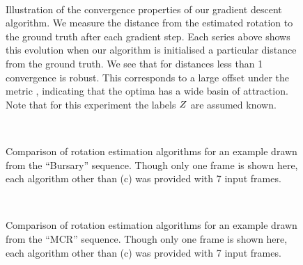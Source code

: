 \begin{figure}[tb]
  \centering
  \\
  \caption{Illustration of the convergence properties of our gradient
    descent algorithm. We measure the distance from the estimated
    rotation to the ground truth after each gradient step. Each series
    above shows this evolution when our algorithm is initialised a
    particular distance from the ground truth. We see that for
    distances less than 1 convergence is robust. This corresponds to a
    large offset under the metric , indicating
    that the optima has a wide basin of attraction. Note that for this
    experiment the labels $\Indicators$ are assumed known.}
  \label{fig:rotation-convergence}
\end{figure}

\begin{figure}[p]
  \centering
  \quad
  \\
  \quad
  \caption{Comparison of rotation estimation algorithms for an example
    drawn from the ``Bursary'' sequence. Though only one frame is
    shown here, each algorithm other than (c) was provided with 7
    input frames.}
  \label{fig:vpt-example1}
\end{figure}

\begin{figure}[p]
  \centering
  \quad
  \\
  \quad
  \caption{Comparison of rotation estimation algorithms for an example
    drawn from the ``MCR'' sequence. Though only one frame is
    shown here, each algorithm other than (c) was provided with 7
    input frames.}
  \label{fig:vpt-example2}
\end{figure}

